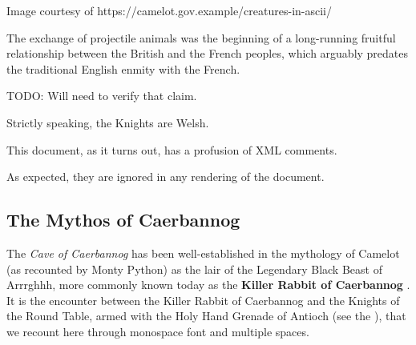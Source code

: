 \documentclass{metanorma}
\newenvironment{comment}{}{}
\begin{document}



\begin{note}
  Image courtesy of
  {https://camelot.gov.example/creatures-in-ascii/}
\end{note}




The exchange of projectile animals was the beginning of a
long-running fruitful relationship between the British and the
French peoples, which
arguably predates the traditional English enmity with the
French.

\begin{comment}
  TODO: Will need to verify that claim.
\end{comment}

\begin{comment}
  Strictly speaking, the Knights are Welsh.
\end{comment}

\begin{comment}
This document, as it turns out, has a profusion of XML comments.

As expected, they are ignored in any rendering of the document.
\end{comment}



\subsection{The Mythos of Caerbannog}
\label{caerbannog}


The \textit{Cave of Caerbannog} has been well-established in the mythology
of Camelot (as recounted by Monty Python) as the lair of the
Legendary Black Beast of Arrrghhh, more commonly known today as the
\textbf{Killer Rabbit of Caerbannog} .
It is the encounter between the Killer Rabbit of Caerbannog and the
Knights of the Round Table, armed with the Holy Hand Grenade of
Antioch (see the ), that we
recount here through monospace font and multiple spaces.
\end{document}
